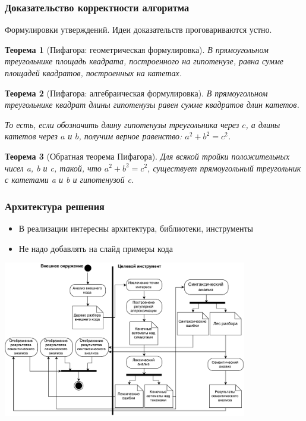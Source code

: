 \documentclass{beamer}
\newtheorem{rutheorem}{Теорема}
\begin{document}
\begin{frame}[fragile]
  \frametitle{Доказательство корректности алгоритма}
  {\tiny Формулировки утверждений. Идеи доказательств проговариваются устно.}
  \begin{rutheorem}[Пифагора: геометрическая формулировка]
    В прямоугольном треугольнике площадь квадрата, построенного на гипотенузе, равна сумме площадей квадратов, построенных на катетах.
  \end{rutheorem}

  \begin{rutheorem}[Пифагора: алгебраическая формулировка]
    В прямоугольном треугольнике квадрат длины гипотенузы равен сумме квадратов длин катетов.    

    То есть, если обозначить длину гипотенузы треугольника через $c$, а длины катетов 
через $a$ и $b$, получим верное равенство: $a^2 + b^2 = c^2$.
  \end{rutheorem}

  \begin{rutheorem}[Обратная теорема Пифагора]
    Для всякой тройки положительных чисел a, b и c, такой, что $a^2 + b^2 = c^2$, существует прямоугольный треугольник с катетами a и b и гипотенузой c.
  \end{rutheorem}  
\end{frame}

\begin{frame}[fragile]
  \frametitle{Архитектура решения}
  \begin{itemize}
    \item В реализации интересны архитектура, библиотеки, инструменты
    \item Не надо добавлять на слайд примеры кода
  \end{itemize}
  \begin{center}
  \includegraphics[width=0.8\textwidth]{pictures/Activ_SEL_Processing.pdf}
  \end{center}
\end{frame}
\end{document}
